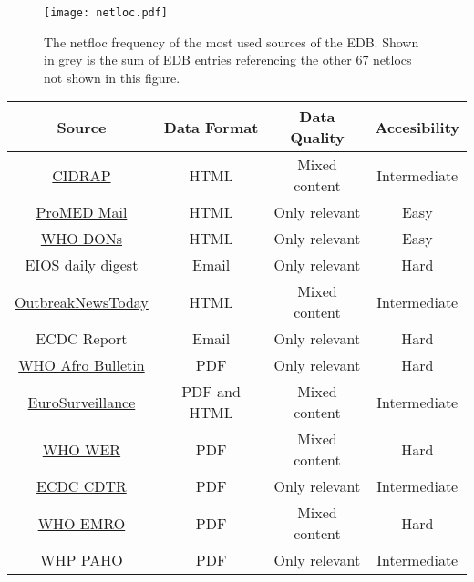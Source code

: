   \begin{figure}
    \centering
    \texttt{[image: netloc.pdf]}
    \caption{The netfloc frequency of the most used sources of the EDB. Shown in grey is the sum of EDB entries referencing the other 67 netlocs not shown in this figure.}
  \label{fig:netloc}
  \end{figure}

  \begin{table}
    \centering
    \begin{tabular}{@{}cccc@{}}
      \toprule
      \textbf{Source} & \textbf{Data Format} & \textbf{Data Quality} & \textbf{Accesibility}\\
      \midrule
      \href{http://www.cidrap.umn.edu/}{CIDRAP} & HTML & Mixed content & Intermediate \\
      \href{http://www.promedmail.org/}{ProMED Mail} & HTML & Only relevant & Easy\\
      \href{http://www.who.int/csr/don/en/}{WHO DONs} & HTML & Only relevant & Easy \\
      EIOS daily digest & Email & Only relevant & Hard \\
      \href{http://outbreaknewstoday.com/}{OutbreakNewsToday} & HTML & Mixed content & Intermediate\\
      ECDC Report & Email & Only relevant & Hard \\
      \href{http://www.afro.who.int/fr/health-topics/disease-outbreaks/outbreaks-and-other-emergencies-updates}{WHO Afro Bulletin} & PDF & Only relevant & Hard \\
      \href{http://www.eurosurveillance.org/content/eurosurveillance/browse}{EuroSurveillance} & PDF and HTML & Mixed content & Intermediate \\
      \href{http://www.who.int/wer/en/}{WHO WER} & PDF & Mixed content & Hard\\
      \href{https://ecdc.europa.eu/en/threats-and-outbreaks/reports-and-data/weekly-threats}{ECDC CDTR} & PDF & Only relevant & Intermediate \\
      \href{http://www.emro.who.int/pandemic-epidemic-diseases/information-resources/weekly-epidemiological-monitor.html}{WHO EMRO} & PDF & Mixed content & Hard \\
      \href{https://www.paho.org/hq/index.php?option=com_content&view=article&id=14044:epidemiological-alerts-archive-by-year-2018&Itemid=72203&lang=en}{WHP PAHO} & PDF & Only relevant & Intermediate\\
      \bottomrule
    \end{tabular}

\end{table}
